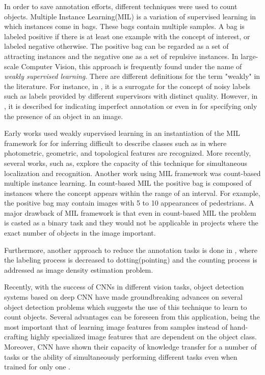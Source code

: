 In order to save annotation efforts, different techniques were used to count objects. Multiple Instance Learning(MIL)\cite{foulds2010review} is a variation of supervised learning in which instances come in bags. These bags contain multiple samples. A bag is labeled positive if there is at least one example with the concept of interest, or labeled negative otherwise. The positive bag can be regarded as a set of attracting instances and the negative one as a set of repulsive instances. In large-scale Computer Vision, this approach is frequently found under the name of \textit{weakly supervised learning}\cite{weber2000unsupervised, fergus2003object}. There are different definitions for the term "weakly" in the literature. For instance, in \cite{dekel2009good}, it is a surrogate for the concept of noisy labels such as labels provided by different supervisors with distinct quality. However, in \cite{raykar2009supervised}, it is described for indicating imperfect annotation or even in \cite{wang2013weakly} for specifying only the presence of an object in an image. 

\indent Early works used weakly supervised learning in an instantiation of the MIL framework for for inferring difficult to describe classes such as in\cite{todorovic2006extracting} where photometric, geometric, and topological features are recognized. More recently, several works, such as\cite{nguyen2009weakly}, explore the capacity of this technique for simultaneous localization and recognition. Another work using MIL framework was count-based multiple instance learning\cite{foulds2010review}. In count-based MIL the positive bag is composed of instances where the concept appears within the range of an interval. For example, the positive bag may contain images with 5 to 10 appearances of pedestrians. A major drawback of MIL framework is that even in count-based MIL the problem is casted as a binary task and they would not be applicable in projects where the exact number of objects in the image important. 

Furthermore, another approach to reduce the annotation tasks is done in \cite{flaccavento2011learning}, where the labeling process is decreased to dotting(pointing) and the counting process is addressed as image density estimation problem.  

Recently, with the success of CNNs in different vision tasks, object detection systems based on deep CNN have made groundbreaking advances on several object detection problems\cite{zhang2015improving, erhan2014scalable, girshick2014rich, he2015spatial, erhan2014scalable} which suggests the use of this technique to learn to count objects. Several advantages can be foreseen from this application, being the most important that of learning image features from samples instead of hand-crafting highly specialized image features that are dependent on the object class\cite{segui2015learning}. Moreover, CNN have shown their capacity of knowledge transfer for a number of tasks or the ability of simultaneously performing different tasks even when trained for only one \cite{zhou2014learning}. 

